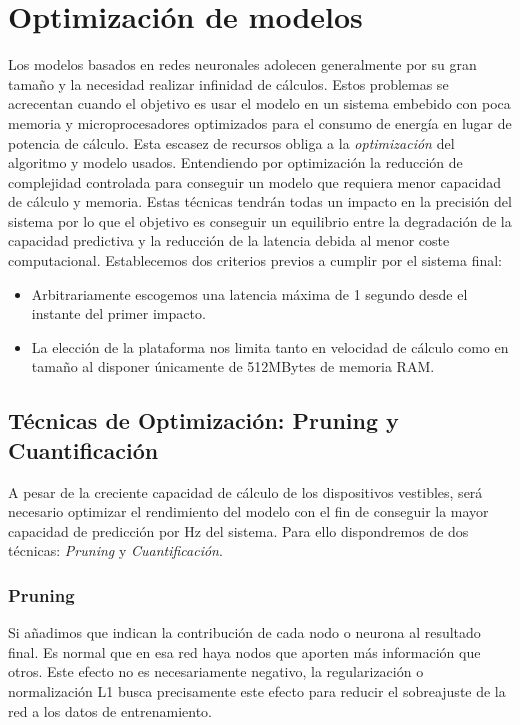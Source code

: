 \section{Optimización de modelos}\label{sec:req:optimizacion}

Los modelos basados en redes neuronales adolecen generalmente por su gran tamaño y la necesidad realizar infinidad de cálculos. Estos problemas se acrecentan cuando el objetivo es usar el modelo en un sistema embebido con poca memoria y microprocesadores optimizados para el consumo de energía en lugar de potencia de cálculo. Esta escasez de recursos obliga a la \textit{optimización} del algoritmo y modelo usados. Entendiendo por optimización la reducción de complejidad controlada para conseguir un modelo que requiera menor capacidad de cálculo y memoria. Estas técnicas tendrán todas un impacto en la precisión del sistema por lo que el objetivo es conseguir un equilibrio entre la degradación de la capacidad predictiva y la reducción de la latencia debida al menor coste computacional. Establecemos dos criterios previos a cumplir por el sistema final:

\begin{itemize}
  \item Arbitrariamente escogemos una latencia máxima de 1 segundo desde el instante del primer impacto.
  \item La elección de la plataforma nos limita tanto en velocidad de cálculo como en tamaño al disponer únicamente de 512MBytes de memoria RAM.
\end{itemize}

\subsection{Técnicas de Optimización: Pruning y Cuantificación}

  A pesar de la creciente capacidad de cálculo de los dispositivos vestibles, será necesario optimizar el rendimiento del modelo con el fin de conseguir la mayor capacidad de predicción por Hz del sistema. Para ello dispondremos de dos técnicas: \textit{Pruning} y \textit{Cuantificación}.

\subsubsection{Pruning}

Si añadimos que indican la contribución de cada nodo o neurona al resultado final. Es normal que en esa red haya nodos que aporten más información que otros. Este efecto no es necesariamente negativo, la regularización o normalización L1 busca precisamente este efecto para reducir el sobreajuste de la red a los datos de entrenamiento.


